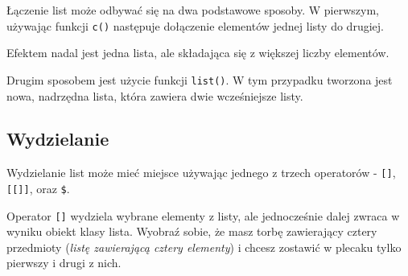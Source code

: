 \documentclass[paper=6in:9in,pagesize=pdftex,headinclude=on,footinclude=on,10pt]{scrbook}
\newenvironment{Shaded}{\begin{snugshade}}{\end{snugshade}}
\newcommand{\CommentTok}[1]{\textcolor[rgb]{0.56,0.35,0.01}{\textit{#1}}}
\newcommand{\KeywordTok}[1]{\textcolor[rgb]{0.13,0.29,0.53}{\textbf{#1}}}
\newcommand{\NormalTok}[1]{#1}
\newcommand{\StringTok}[1]{\textcolor[rgb]{0.31,0.60,0.02}{#1}}
\begin{document}
Łączenie list może odbywać się na dwa podstawowe sposoby.
W pierwszym, używając funkcji \texttt{c()} następuje dołączenie elementów jednej listy do drugiej.

\begin{Shaded}
\end{Shaded}

Efektem nadal jest jedna lista, ale składająca się z większej liczby elementów.

Drugim sposobem jest użycie funkcji \texttt{list()}.
W tym przypadku tworzona jest nowa, nadrzędna lista, która zawiera dwie wcześniejsze listy.

\begin{Shaded}
\end{Shaded}

\hypertarget{wydzielanie-list}{%
\subsection{Wydzielanie}\label{wydzielanie-list}}

Wydzielanie list może mieć miejsce używając jednego z trzech operatorów - \texttt{{[}{]}}, \texttt{{[}{[}{]}{]}}, oraz \texttt{\$}.

Operator \texttt{{[}{]}} wydziela wybrane elementy z listy, ale jednocześnie dalej zwraca w wyniku obiekt klasy lista.
Wyobraź sobie, że masz torbę zawierający cztery przedmioty (\emph{listę zawierającą cztery elementy}) i chcesz zostawić w plecaku tylko pierwszy i drugi z nich.
\end{document}
